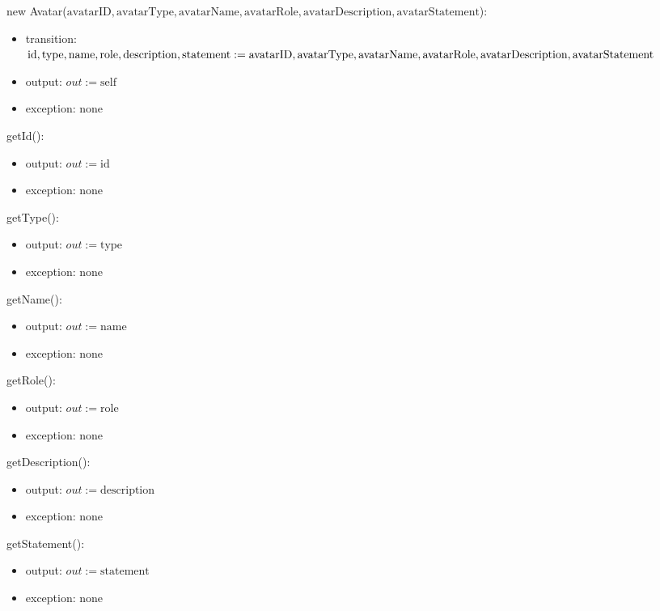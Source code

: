 \documentclass[12pt, titlepage]{article}
\begin{document}
\noindent new Avatar($\text{avatarID}, \text{avatarType}, \text{avatarName}, \text{avatarRole}, \text{avatarDescription}, \text{avatarStatement}$):
\begin{itemize}
\item transition: $\text{id}, \text{type}, \text{name}, \text{role}, \text{description}, \text{statement}:= \text{avatarID}, \text{avatarType}, \newline \text{avatarName}, \text{avatarRole},\text{avatarDescription}, \text{avatarStatement}$
\item output: $out := \mbox{self}$
\item exception: none
\end{itemize}


\noindent getId():
\begin{itemize}
\item output: $out := \text{id}$
\item exception: none
\end{itemize}


\noindent getType():
\begin{itemize}
\item output: $out := \text{type}$
\item exception: none
\end{itemize}


\noindent getName():
\begin{itemize}
\item output: $out := \text{name}$
\item exception: none
\end{itemize}


\noindent getRole():
\begin{itemize}
\item output: $out := \text{role}$
\item exception: none
\end{itemize}

\noindent getDescription():
\begin{itemize}
\item output: $out := \text{description}$
\item exception: none
\end{itemize}

\noindent getStatement():
\begin{itemize}
\item output: $out := \text{statement}$
\item exception: none
\end{itemize}
\end{document}

